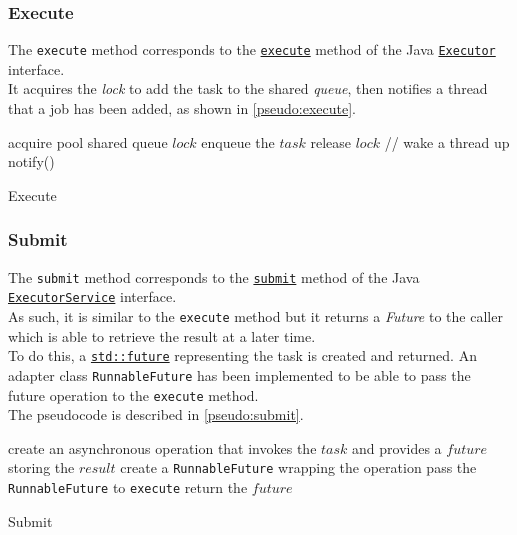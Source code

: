 \documentclass[10pt,twocolumn,letterpaper]{article}
\begin{document}
	\subsubsection{Execute}
	The \lstinline|execute| method corresponds to the  \href{https://docs.oracle.com/javase/7/docs/api/java/util/concurrent/Executor.html#execute(java.lang.Runnable)}{\lstinline{execute}} method of the Java  \href{https://docs.oracle.com/javase/7/docs/api/java/util/concurrent/Executor.html}{\lstinline{Executor}} interface.\\
	It acquires the \textit{lock} to add the task to the shared \textit{queue}, then notifies a thread that a job has been added, as shown in \cref{pseudo:execute}.
	\begin{algorithm}
		\SetAlgoLined
		acquire pool shared queue $lock$\;
		enqueue the $task$\;
		release $lock$\;
		// wake a thread up\\
		notify()\;
		\caption{Execute}
		\label{pseudo:execute}
	\end{algorithm}
	\subsubsection{Submit}
	The \lstinline|submit| method corresponds to the  \href{https://docs.oracle.com/javase/7/docs/api/java/util/concurrent/ExecutorService.html#submit(java.lang.Runnable,\%20T)}{\lstinline{submit}} method of the Java  \href{https://docs.oracle.com/javase/7/docs/api/java/util/concurrent/ExecutorService.html}{\lstinline{ExecutorService}} interface.\\
	As such, it is similar to the \lstinline|execute| method but it returns a \textit{Future} to the caller which is able to retrieve the result at a later time.\\
	To do this, a \href{https://en.cppreference.com/w/cpp/thread/future}{\lstinline|std::future|} representing the task is created and returned.
	An adapter class \lstinline|RunnableFuture| has been implemented to be able to pass the future operation to the \lstinline|execute| method.\\
	The pseudocode is described in \cref{pseudo:submit}.
	\begin{algorithm}
		\SetAlgoLined
		\KwData{$task$, $result$}
		create an asynchronous operation that invokes the $task$ and provides a $future$ storing the $result$\;
		create a \lstinline|RunnableFuture| wrapping the operation\;
		pass the \lstinline|RunnableFuture| to \lstinline|execute|\;
		return the $future$\;
		\caption{Submit}
		\label{pseudo:submit}
	\end{algorithm}
	
\end{document}

